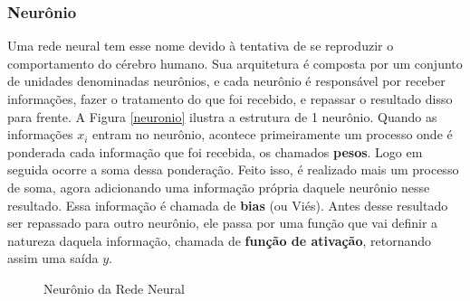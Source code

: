 \subsubsection{Neurônio}

Uma rede neural tem esse nome devido à tentativa de se reproduzir o comportamento do cérebro humano. Sua arquitetura é composta por um conjunto de unidades denominadas neurônios, e cada neurônio é responsável por receber informações, fazer o tratamento do que foi recebido, e repassar o resultado disso para frente. A Figura \ref{neuronio} ilustra a estrutura de 1 neurônio. Quando as informações $x_i$ entram no neurônio, acontece primeiramente um processo onde é ponderada cada informação que foi recebida, os chamados \textbf{pesos}. Logo em seguida ocorre a soma dessa ponderação. Feito isso, é realizado mais um processo de soma, agora adicionando uma informação própria daquele neurônio nesse resultado. Essa informação é chamada de \textbf{bias} (ou Viés). Antes desse resultado ser repassado para outro neurônio, ele passa por uma função que vai definir a natureza daquela informação, chamada de \textbf{função de ativação}, retornando assim uma saída $y$.

 \begin{figure}[H]
    \centering
     \caption{Neurônio da Rede Neural}
   
    \label{fig:my_label}
\end{figure} 

